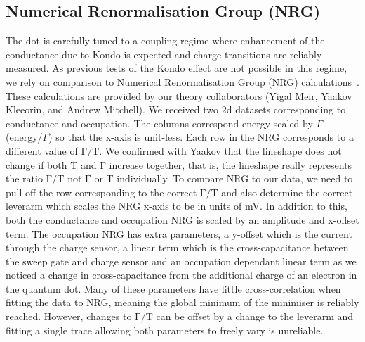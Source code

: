 \subsection{Numerical Renormalisation Group (NRG)}
The dot is carefully tuned to a coupling regime where enhancement of the conductance due to Kondo is expected and charge transitions are reliably measured. As previous tests of the Kondo effect are not possible in this regime, we rely on comparison to Numerical Renormalisation Group (NRG) calculations~\cite{nrg}. These calculations are provided by our theory collaborators (Yigal Meir, Yaakov Kleeorin, and Andrew Mitchell). 
We received two 2d datasets corresponding to conductance and occupation. The columns correspond energy scaled by $\Gamma$ (energy/$\Gamma$) so that the x-axis is unit-less. Each row in the NRG corresponds to a different value of $\mathrm{\Gamma/T}$.  We confirmed with Yaakov that the lineshape does not change if both $\mathrm{T}$ and $\mathrm{\Gamma}$ increase together, that is, the lineshape really represents the ratio $\mathrm{\Gamma/T}$ not $\mathrm{\Gamma}$ or $\mathrm{T}$ individually.
To compare NRG to our data, we need to pull off the row corresponding to the correct $\mathrm{\Gamma/T}$ and also determine the correct leverarm which scales the NRG x-axis to be in units of mV. In addition to this, both the conductance and occupation NRG is scaled by an amplitude and x-offset term. The occupation NRG has extra parameters, a y-offset which is the current through the charge sensor, a linear term which is the cross-capacitance between the sweep gate and charge sensor and an occupation dependant linear term as we noticed a change in cross-capacitance from the additional charge of an electron in the quantum dot. Many of these parameters have little cross-correlation when fitting the data to NRG, meaning the global minimum of the minimiser is reliably reached. However, changes to $\mathrm{\Gamma/T}$ can be offset by a change to the leverarm and fitting a single trace allowing both parameters to freely vary is unreliable. 


